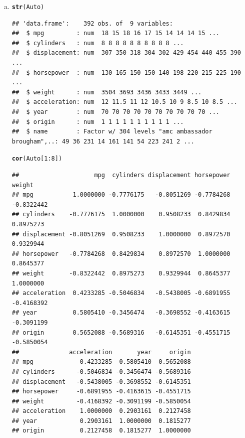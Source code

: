 \documentclass{article}\usepackage[]{graphicx}\usepackage[]{color}
\makeatletter
\newcommand{\hlnum}[1]{\textcolor[rgb]{0.686,0.059,0.569}{#1}}%
\newcommand{\hlopt}[1]{\textcolor[rgb]{0,0,0}{#1}}%
\newcommand{\hlstd}[1]{\textcolor[rgb]{0.345,0.345,0.345}{#1}}%
\newcommand{\hlkwd}[1]{\textcolor[rgb]{0.737,0.353,0.396}{\textbf{#1}}}%
\newenvironment{kframe}{%
 \def\at@end@of@kframe{}%
 \ifinner\ifhmode%
  \def\at@end@of@kframe{\end{minipage}}%
  \begin{minipage}{\columnwidth}%
 \fi\fi%
 \def\FrameCommand##1{\hskip\@totalleftmargin \hskip-\fboxsep
 \colorbox{shadecolor}{##1}\hskip-\fboxsep
     \hskip-\linewidth \hskip-\@totalleftmargin \hskip\columnwidth}%
 \MakeFramed {\advance\hsize-\width
   \@totalleftmargin\z@ \linewidth\hsize
   \@setminipage}}%
 {\par\unskip\endMakeFramed%
 \at@end@of@kframe}
\newenvironment{knitrout}{}{} %
\makeatother
\begin{document}
\begin{enumerate}[(a)]
\item
\begin{knitrout}
\color{fgcolor}\begin{kframe}
\begin{alltt}
\hlkwd{str}\hlstd{(Auto)}
\end{alltt}
\begin{verbatim}
## 'data.frame':	392 obs. of  9 variables:
##  $ mpg         : num  18 15 18 16 17 15 14 14 14 15 ...
##  $ cylinders   : num  8 8 8 8 8 8 8 8 8 8 ...
##  $ displacement: num  307 350 318 304 302 429 454 440 455 390 ...
##  $ horsepower  : num  130 165 150 150 140 198 220 215 225 190 ...
##  $ weight      : num  3504 3693 3436 3433 3449 ...
##  $ acceleration: num  12 11.5 11 12 10.5 10 9 8.5 10 8.5 ...
##  $ year        : num  70 70 70 70 70 70 70 70 70 70 ...
##  $ origin      : num  1 1 1 1 1 1 1 1 1 1 ...
##  $ name        : Factor w/ 304 levels "amc ambassador brougham",..: 49 36 231 14 161 141 54 223 241 2 ...
\end{verbatim}
\begin{alltt}
\hlkwd{cor}\hlstd{(Auto[}\hlnum{1}\hlopt{:}\hlnum{8}\hlstd{])}
\end{alltt}
\begin{verbatim}
##                     mpg  cylinders displacement horsepower     weight
## mpg           1.0000000 -0.7776175   -0.8051269 -0.7784268 -0.8322442
## cylinders    -0.7776175  1.0000000    0.9508233  0.8429834  0.8975273
## displacement -0.8051269  0.9508233    1.0000000  0.8972570  0.9329944
## horsepower   -0.7784268  0.8429834    0.8972570  1.0000000  0.8645377
## weight       -0.8322442  0.8975273    0.9329944  0.8645377  1.0000000
## acceleration  0.4233285 -0.5046834   -0.5438005 -0.6891955 -0.4168392
## year          0.5805410 -0.3456474   -0.3698552 -0.4163615 -0.3091199
## origin        0.5652088 -0.5689316   -0.6145351 -0.4551715 -0.5850054
##              acceleration       year     origin
## mpg             0.4233285  0.5805410  0.5652088
## cylinders      -0.5046834 -0.3456474 -0.5689316
## displacement   -0.5438005 -0.3698552 -0.6145351
## horsepower     -0.6891955 -0.4163615 -0.4551715
## weight         -0.4168392 -0.3091199 -0.5850054
## acceleration    1.0000000  0.2903161  0.2127458
## year            0.2903161  1.0000000  0.1815277
## origin          0.2127458  0.1815277  1.0000000
\end{verbatim}
\end{kframe}
\end{knitrout}


\end{enumerate}
\end{document}
